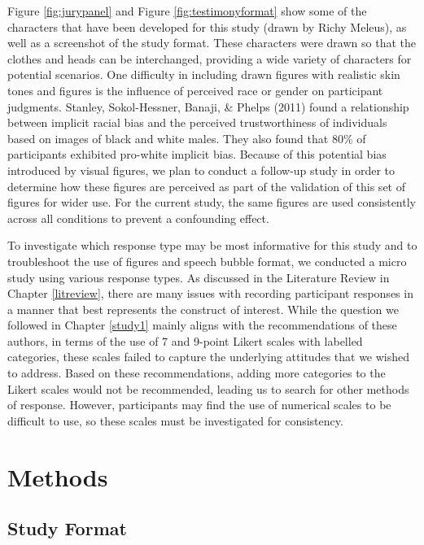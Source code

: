 \documentclass[print]{nuthesis}
\begin{document}
Figure \ref{fig:jurypanel} and Figure \ref{fig:testimonyformat} show some of the characters that have been developed for this study (drawn by Richy Meleus), as well as a screenshot of the study format.
These characters were drawn so that the clothes and heads can be interchanged, providing a wide variety of characters for potential scenarios.
One difficulty in including drawn figures with realistic skin tones and figures is the influence of perceived race or gender on participant judgments.
Stanley, Sokol-Hessner, Banaji, \& Phelps (2011) found a relationship between implicit racial bias and the perceived trustworthiness of individuals based on images of black and white males.
They also found that 80\% of participants exhibited pro-white implicit bias.
Because of this potential bias introduced by visual figures, we plan to conduct a follow-up study in order to determine how these figures are perceived as part of the validation of this set of figures for wider use.
For the current study, the same figures are used consistently across all conditions to prevent a confounding effect.

To investigate which response type may be most informative for this study and to troubleshoot the use of figures and speech bubble format, we conducted a micro study using various response types.
As discussed in the Literature Review in Chapter \ref{litreview}, there are many issues with recording participant responses in a manner that best represents the construct of interest.
While the question we followed in Chapter \ref{study1} mainly aligns with the recommendations of these authors, in terms of the use of 7 and 9-point Likert scales with labelled categories, these scales failed to capture the underlying attitudes that we wished to address.
Based on these recommendations, adding more categories to the Likert scales would not be recommended, leading us to search for other methods of response.
However, participants may find the use of numerical scales to be difficult to use, so these scales must be investigated for consistency.

\hypertarget{methods-1}{%
\section{Methods}\label{methods-1}}

\hypertarget{study-format-1}{%
\subsection{Study Format}\label{study-format-1}}
\end{document}
